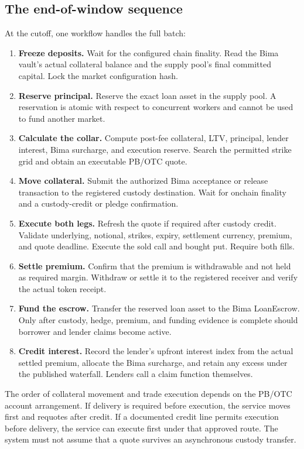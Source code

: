 \documentclass[11pt,oneside]{article}
\begin{document}
\subsection{The end-of-window sequence}

At the cutoff, one workflow handles the full batch:

\begin{enumerate}
\item \textbf{Freeze deposits.} Wait for the configured chain finality. Read the Bima vault's actual collateral balance and the supply pool's final committed capital. Lock the market configuration hash.
\item \textbf{Reserve principal.} Reserve the exact loan asset in the supply pool. A reservation is atomic with respect to concurrent workers and cannot be used to fund another market.
\item \textbf{Calculate the collar.} Compute post-fee collateral, LTV, principal, lender interest, Bima surcharge, and execution reserve. Search the permitted strike grid and obtain an executable PB/OTC quote.
\item \textbf{Move collateral.} Submit the authorized Bima acceptance or release transaction to the registered custody destination. Wait for onchain finality and a custody-credit or pledge confirmation.
\item \textbf{Execute both legs.} Refresh the quote if required after custody credit. Validate underlying, notional, strikes, expiry, settlement currency, premium, and quote deadline. Execute the sold call and bought put. Require both fills.
\item \textbf{Settle premium.} Confirm that the premium is withdrawable and not held as required margin. Withdraw or settle it to the registered receiver and verify the actual token receipt.
\item \textbf{Fund the escrow.} Transfer the reserved loan asset to the Bima LoanEscrow. Only after custody, hedge, premium, and funding evidence is complete should borrower and lender claims become active.
\item \textbf{Credit interest.} Record the lender's upfront interest index from the actual settled premium, allocate the Bima surcharge, and retain any excess under the published waterfall. Lenders call a claim function themselves.
\end{enumerate}

The order of collateral movement and trade execution depends on the PB/OTC account arrangement. If delivery is required before execution, the service moves first and requotes after credit. If a documented credit line permits execution before delivery, the service can execute first under that approved route. The system must not assume that a quote survives an asynchronous custody transfer.
\end{document}
